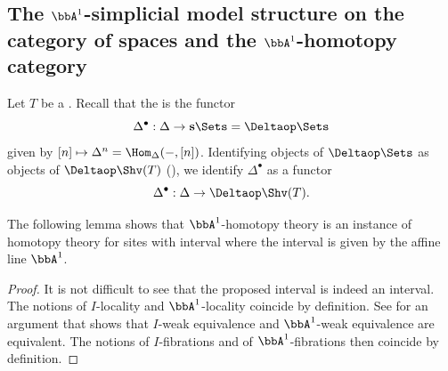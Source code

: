\subsection{The \texorpdfstring{$\bbA^1$}{A1}-simplicial model structure on the category of spaces and the \texorpdfstring{$\bbA^1$}{A1}-homotopy category}

\begin{convention} \label{convention:standard_simplicial_n_simplex_functor_as_a_functor_from_Delta_to_Delta_op_Shv_T}
    Let $T$ be a .
    Recall that the  is the functor
    $$\Delta^\bullet: \Delta \to \mathbf{s}\Sets = \Deltaop \Sets$$
     
    given by $[n] \mapsto \Delta^n = \Hom_{\Delta}(-, [n])$.
    Identifying objects of $\Deltaop \Sets$ as objects of $\Deltaop \Shv(T)$ (), we identify $\Delta^\bullet$ as a functor
    $$\Delta^\bullet: \Delta \to \Deltaop \Shv(T).$$
    
\end{convention}



The following lemma shows that $\bbA^1$-homotopy theory is an instance of homotopy theory for sites with interval where the interval is given by the affine line $\bbA^1$.

\begin{proof}
    It is not difficult to see that the proposed interval is indeed an interval. The notions of $I$-locality and $\bbA^1$-locality coincide by definition. See \cite[Lemma 2.5.5]{choudury_htsA1fg} for an argument that shows that $I$-weak equivalence and $\bbA^1$-weak equivalence are equivalent. The notions of $I$-fibrations and of $\bbA^1$-fibrations then coincide by definition.
\end{proof}


